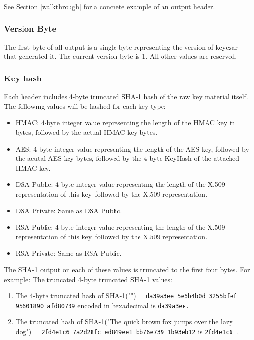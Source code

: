 \documentclass{llncs}
\begin{document}
See Section \ref{walkthrough} for a concrete example of an output header.

\subsubsection{Version Byte}

The first byte of all output is a single byte representing the version of
keyczar that generated it. The current version byte is 1. All other values are
reserved.

\subsubsection{Key hash}\label{keyhash}

Each header includes 4-byte truncated SHA-1 hash of the raw key
material itself. The following values will be hashed for each key type:
\begin{itemize}
  \item HMAC: 4-byte integer value representing the length of the HMAC key in
  bytes, followed by the actual HMAC key bytes.
  \item AES: 4-byte integer value representing the length of the AES key,
  followed by the acutal AES key bytes, followed by the 4-byte KeyHash of the
  attached HMAC key.
  \item DSA Public: 4-byte integer value representing the length of the X.509
  representation of this key, followed by the X.509 representation.
  \item DSA Private: Same as DSA Public.
  \item RSA Public: 4-byte integer value representing the length of the X.509
  representation of this key, followed by the X.509 representation.
  \item RSA Private: Same as RSA Public.
\end{itemize}

The SHA-1 output on each of these values is truncated to the first four bytes.
For example: The truncated 4-byte truncated SHA-1 values:
\begin{enumerate}
  \item The 4-byte truncated hash of SHA-1("") = {\tt da39a3ee 5e6b4b0d 3255bfef
  95601890 afd80709} encoded in hexadecimal is {\tt da39a3ee.}
  \item The truncated hash of SHA-1("The quick brown fox jumps over the lazy
  dog") = {\tt 2fd4e1c6 7a2d28fc ed849ee1 bb76e739 1b93eb12} is
  {\tt 2fd4e1c6 }.
\end{enumerate}
\end{document}
